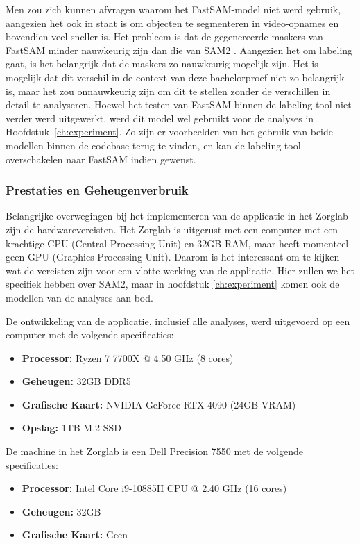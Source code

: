 Men zou zich kunnen afvragen waarom het FastSAM-model niet werd gebruik, aangezien het ook in staat is om objecten te segmenteren in video-opnames en bovendien veel sneller is.
Het probleem is dat de gegenereerde maskers van FastSAM minder nauwkeurig zijn dan die van SAM2 \autocite{Zhao2023}. 
Aangezien het om labeling gaat, is het belangrijk dat de maskers zo nauwkeurig mogelijk zijn.
Het is mogelijk dat dit verschil in de context van deze bachelorproef niet zo belangrijk is, maar het zou onnauwkeurig zijn om dit te stellen zonder de verschillen in detail te analyseren.
Hoewel het testen van FastSAM binnen de labeling-tool niet verder werd uitgewerkt, werd dit model wel gebruikt voor de analyses in Hoofdstuk~\ref{ch:experiment}.
Zo zijn er voorbeelden van het gebruik van beide modellen binnen de codebase terug te vinden, en kan de labeling-tool overschakelen naar FastSAM indien gewenst.

\subsubsection{Prestaties en Geheugenverbruik}

Belangrijke overwegingen bij het implementeren van de applicatie in het Zorglab zijn de hardwarevereisten.
Het Zorglab is uitgerust met een computer met een krachtige CPU (Central Processing Unit) en 32GB RAM, maar heeft momenteel geen GPU (Graphics Processing Unit).
Daarom is het interessant om te kijken wat de vereisten zijn voor een vlotte werking van de applicatie.
Hier zullen we het specifiek hebben over SAM2, maar in hoofdstuk \ref{ch:experiment} komen ook de modellen van de analyses aan bod.

De ontwikkeling van de applicatie, inclusief alle analyses, werd uitgevoerd op een computer met de volgende specificaties:
\begin{itemize}
    \item \textbf{Processor:} Ryzen 7 7700X @ 4.50 GHz (8 cores)
    \item \textbf{Geheugen:} 32GB DDR5
    \item \textbf{Grafische Kaart:} NVIDIA GeForce RTX 4090 (24GB VRAM)
    \item \textbf{Opslag:} 1TB M.2 SSD
\end{itemize}

De machine in het Zorglab is een Dell Precision 7550 met de volgende specificaties:
\begin{itemize}
    \item \textbf{Processor:} Intel Core i9-10885H CPU @ 2.40 GHz (16 cores)
    \item \textbf{Geheugen:} 32GB
    \item \textbf{Grafische Kaart:} Geen
\end{itemize}


